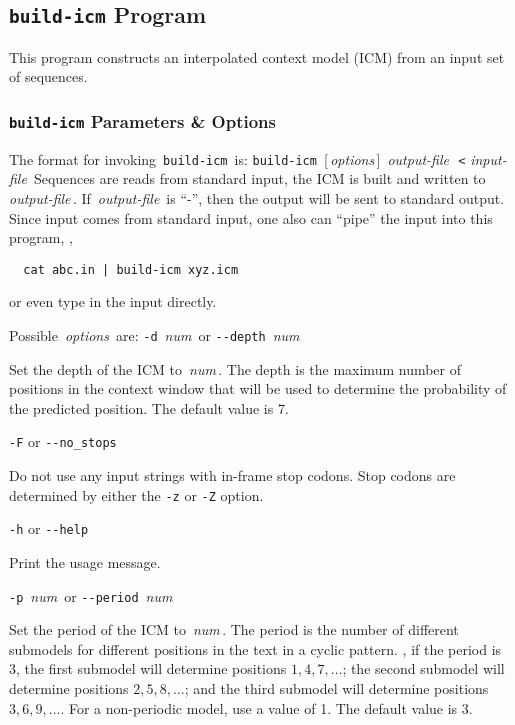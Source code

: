 \documentclass[fleqn,titlepage,11pt]{article}
\def\Desc#1{\,\mbox{\emph{#1}}\,}
\def\Pg#1{\texttt{#1}}
\begin{document}
\subsection{\Pg{build-icm} Program}

This program constructs an interpolated context model (ICM)
from an input set of sequences.

\subsubsection{\Pg{build-icm} Parameters \& Options}
The format for invoking \,\Pg{build-icm}\, is:
\bq
  \Pg{build-icm}\, [\Desc{options}] \Desc{output-file} \,\Pg{<}\,\Desc{input-file}
\eq
Sequences are reads from standard input, the ICM is
built and written to \Desc{output-file}.  If \Desc{output-file}
is ``-'', then the output will be sent to standard output.
Since input comes from standard input, one also can ``pipe'' the input
into this program, \eg,
\BSV
\begin{verbatim}
  cat abc.in | build-icm xyz.icm
\end{verbatim}
\ESV
or even type in the input directly.

Possible \Desc{options} are:
\bl{}\RaggedRight
\exdent
  \verb`-d` \Desc{num} \enskip or \enskip \verb`--depth` \Desc{num}

  Set the depth of the ICM to \Desc{num}.  The depth is the
  maximum number of positions in the context window that
  will be used to determine the probability of the predicted
  position.  The default value is 7.

\exdent
  \verb`-F` \enskip or \enskip \verb`--no_stops`

  Do not use any input strings with in-frame stop codons.
  Stop codons are determined by either the \Pg{-z} or \Pg{-Z}
  option.

\exdent
  \verb`-h` \enskip or \enskip \verb`--help`

  Print the usage message.

\exdent
  \verb`-p` \Desc{num} \enskip or \enskip \verb`--period` \Desc{num}

  Set the period of the ICM to \Desc{num}.  The period is the
  number of different submodels for different positions in the
  text in a cyclic pattern.  \Eg, if the period is 3, the first
  submodel will determine positions $1, 4, 7, \dots$; the second
  submodel will determine positions $2, 5, 8, \dots$; and the third
  submodel will determine positions $3, 6, 9, \dots$.  For a
  non-periodic model, use a value of 1.  The default value
  is 3.
\end{document}
